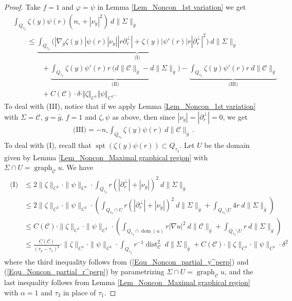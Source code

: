 \documentclass[11pt, letterpaper, reqno]{amsart}
\numberwithin{equation}{section}
\theoremstyle{remark}
\newcommand{\cC}{\mathcal{C}}
\newcommand{\supp}{\operatorname{spt}}
\newcommand{\graph}{\operatorname{graph}}
\newcommand{\dist}{\operatorname{dist}}
\DeclareMathOperator{\Dom}{dom}
\begin{document}
   \begin{proof}
     Take $f=1$ and $\varphi=\psi$ in Lemma \ref{Lem_Noncon_1st variation} we get
     \begin{align*}
      &  \int_{Q_{\tau_2}} \zeta(y)\psi(r)(n_\circ + |\nu_y|^2)\ d\|\Sigma\|_{\bar g} \\
       & \qquad \leq \underbrace{\int_{Q_{\tau_2}} \big( |\nabla_{\bar g}\zeta(y)|\psi(r) |\nu_y||r\partial_r^\perp| + \zeta(y)|\psi'(r)|r|\partial_r^\perp|^2\big) \ d\|\Sigma\|_{\bar g}}_{\text{(I)}} \\
       & \qquad \qquad + \underbrace{\int_{Q_{\tau_2}} \zeta(y)\psi'(r)r\ \big(d\|\cC\|_{\bar g} - d\|\Sigma\|_{\bar g}\big) }_{\text{(II)}} - 
       \underbrace{\int_{Q_{\tau_2}} \zeta(y)\psi'(r)r\ d\|\cC\|_{\bar g}}_{\text{(III)}} \\
       & \qquad \qquad + C(\cC) \cdot \delta \cdot \Vert \zeta \Vert_{C^1}  \Vert \psi\Vert_{C^1}.
     \end{align*}
     To deal with (III), notice that if we apply Lemma \ref{Lem_Noncon_1st variation} with $\Sigma=\cC$, $g = \bar g$, $f=1$ and $\zeta, \psi$ as above, then since $|\nu_y| = |\partial_r^\perp| = 0$, we get 
     \begin{align}
       \text{(III)} = -n_\circ \int_{Q_{\tau_2}} \zeta(y)\psi(r)\ d\|\cC\|_{\bar g} \,.   \label{Equ_Noncon_Pf vol diff bd, (III)}
     \end{align}
     To deal with (I), recall that $\supp(\zeta(y)\psi(r)) \subset Q_{\tau_3}$. Let $U$ be the domain given by Lemma \ref{Lem_Noncon_Maximal graphical region} with $\Sigma \cap U = \graph_\cC u$. We have 
     \begin{align}
      \begin{split}
       \text{(I)} & \leq 2\|\zeta\|_{C^1}\cdot \|\psi\|_{C^1} \cdot \int_{Q_{\tau_3}}r(|\partial_r^\perp|+|\nu_y|)^2 \ d\|\Sigma\|_{\bar g} \\
       & \leq 2\|\zeta\|_{C^1}\cdot \|\psi\|_{C^1} \cdot \left( \int_{Q_{\tau_3}\cap U} r(|\partial_r^\perp|+|\nu_y|)^2\ d\|\Sigma\|_{\bar g} + \int_{Q_{\tau_3}\setminus U} 4r\ d\|\Sigma\|_{\bar g} \right) \\
       & \leq C(\cC)\cdot\|\zeta\|_{C^1}\cdot \|\psi\|_{C^1} \cdot \left( \int_{Q_{\tau_3}\cap \Dom(u)} r|\nabla u|^2\ d\|\cC\|_{\bar g} + \int_{Q_{\tau_3}\setminus U} r\ d\|\Sigma\|_{\bar g} \right) \\
       & \leq \frac{C(\cC)}{(\tau_2-\tau_1)^2}\cdot\|\zeta\|_{C^1}\cdot \|\psi\|_{C^1} \cdot \int_{Q_{\tau_2}} r^{-1}\dist_\cC^2\ d\|\Sigma\|_{\bar g} + C(\cC)\cdot \|\zeta\|_{C^1}\cdot \|\psi\|_{C^1}\cdot  \delta^2
      \end{split} \label{Equ_Noncon_Pf vol diff bd, (I)}
     \end{align}
     where the third inequality follows from (\ref{Equ_Noncon_partial_y^perp}) and (\ref{Equ_Noncon_partial_r^perp}) by parametrizing $\Sigma \cap U = \graph_\cC u$, and the last inequality follows from Lemma \ref{Lem_Noncon_Maximal graphical region} with $\alpha=1$ and $\tau_3$ in place of $\tau_1$.


\end{proof}
\end{document}

